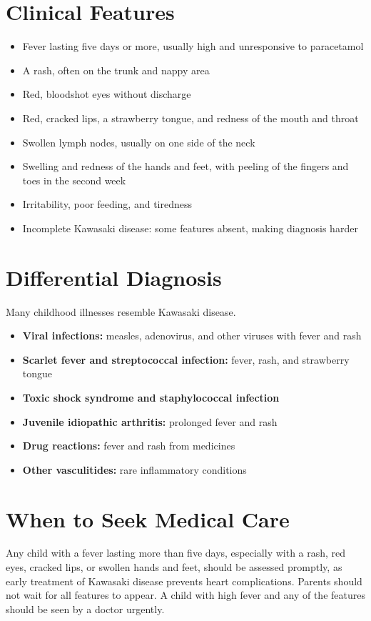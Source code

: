 \section*{Clinical Features}
\begin{itemize}
    \item Fever lasting five days or more, usually high and unresponsive to paracetamol
    \item A rash, often on the trunk and nappy area
    \item Red, bloodshot eyes without discharge
    \item Red, cracked lips, a strawberry tongue, and redness of the mouth and throat
    \item Swollen lymph nodes, usually on one side of the neck
    \item Swelling and redness of the hands and feet, with peeling of the fingers and toes in the second week
    \item Irritability, poor feeding, and tiredness
    \item Incomplete Kawasaki disease: some features absent, making diagnosis harder
\end{itemize}

\section*{Differential Diagnosis}
Many childhood illnesses resemble Kawasaki disease.
\begin{itemize}
    \item \textbf{Viral infections:} measles, adenovirus, and other viruses with fever and rash
    \item \textbf{Scarlet fever and streptococcal infection:} fever, rash, and strawberry tongue
    \item \textbf{Toxic shock syndrome and staphylococcal infection}
    \item \textbf{Juvenile idiopathic arthritis:} prolonged fever and rash
    \item \textbf{Drug reactions:} fever and rash from medicines
    \item \textbf{Other vasculitides:} rare inflammatory conditions
\end{itemize}

\section*{When to Seek Medical Care}
Any child with a fever lasting more than five days, especially with a rash, red eyes, cracked lips, or swollen hands and feet, should be assessed promptly, as early treatment of Kawasaki disease prevents heart complications. Parents should not wait for all features to appear. A child with high fever and any of the features should be seen by a doctor urgently.

